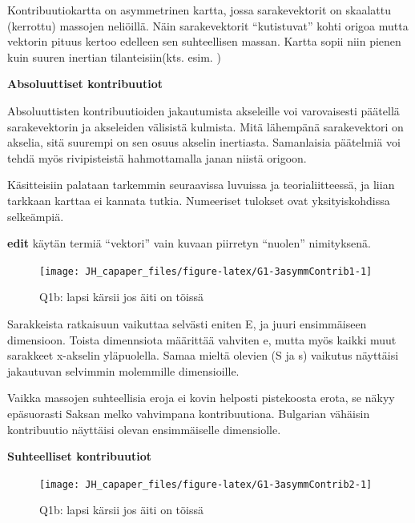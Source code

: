 \documentclass[
  finnish,
]{book}
\begin{document}
Kontribuutiokartta on asymmetrinen kartta, jossa sarakevektorit on skaalattu
(kerrottu) massojen neliöillä. Näin sarakevektorit ``kutistuvat'' kohti origoa mutta
vektorin pituus kertoo edelleen sen suhteellisen massan. Kartta sopii niin pienen
kuin suuren inertian tilanteisiin(kts. esim. \citep{RefWorks:doc:5c768b09e4b02df9431e950a})

\textbf{Absoluuttiset kontribuutiot}

Absoluuttisten kontribuutioiden jakautumista akseleille voi varovaisesti päätellä
sarakevektorin ja akseleiden välisistä kulmista. Mitä lähempänä sarakevektori on akselia,
sitä suurempi on sen osuus akselin inertiasta. Samanlaisia päätelmiä voi tehdä myös
rivipisteistä hahmottamalla janan niistä origoon.

Käsitteisiin palataan tarkemmin seuraavissa luvuissa ja teorialiitteessä, ja liian
tarkkaan karttaa ei kannata tutkia. Numeeriset tulokset ovat yksityiskohdissa selkeämpiä.

\textbf{edit} käytän termiä ``vektori'' vain kuvaan piirretyn ``nuolen'' nimityksenä.

\begin{figure}

{\centering \texttt{[image: JH\_capaper\_files/figure-latex/G1-3asymmContrib1-1]} 

}

\caption{Q1b: lapsi kärsii jos äiti on töissä}\label{fig:G1-3asymmContrib1}
\end{figure}

Sarakkeista ratkaisuun vaikuttaa selvästi eniten E, ja juuri ensimmäiseen
dimensioon. Toista dimennsiota määrittää vahviten e, mutta myös kaikki muut
sarakkeet x-akselin yläpuolella. Samaa mieltä olevien (S ja s) vaikutus näyttäisi
jakautuvan selvimmin molemmille dimensioille.

Vaikka massojen suhteellisia eroja ei kovin helposti pistekoosta erota, se näkyy
epäsuorasti Saksan melko vahvimpana kontribuutiona. Bulgarian vähäisin kontribuutio
näyttäisi olevan ensimmäiselle dimensiolle.

\textbf{Suhteelliset kontribuutiot}

\begin{figure}

{\centering \texttt{[image: JH\_capaper\_files/figure-latex/G1-3asymmContrib2-1]} 

}

\caption{Q1b: lapsi kärsii jos äiti on töissä}\label{fig:G1-3asymmContrib2}
\end{figure}
\end{document}

